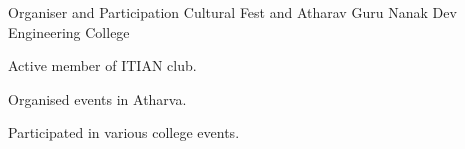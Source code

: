 


\begin{cventries}


\cventry
{Organiser and Participation} %
{Cultural Fest and Atharav } %
{Guru Nanak Dev Engineering College} %
{} %
{ %
\begin{cvitems}
\item {Active member of ITIAN club.}
\item {Organised events in Atharva.}
\item {Participated in various college events.}
\end{cvitems}
}
\end{cventries}